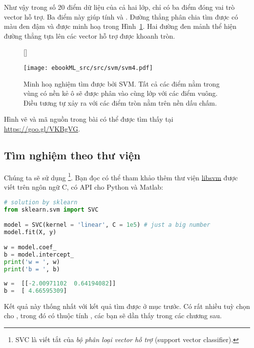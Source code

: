 Như vậy trong số 20 điểm dữ liệu của cả hai lớp, chỉ có ba điểm đóng vai trò  vector hỗ trợ. Ba điểm này giúp tính  và
.
Đường thẳng phân chia tìm được có màu đen đậm và được minh hoạ trong Hình~\ref{fig:svmf5}. Hai đường đen mảnh thể hiện
đường thẳng {tựa} lên các vector hỗ trợ được khoanh tròn.


\begin{figure}[t]
[\FBwidth]
{\caption{
Minh hoạ nghiệm tìm được bởi SVM. Tất cả các điểm nằm trong vùng có nền kẻ ô sẽ được phân vào cùng lớp với các điểm vuông. Điều tương tự xảy
ra với các điểm tròn nằm trên nền dấu chấm.
}
\label{fig:svmf5}}
{ %
\texttt{[image: ebookML\_src/src/svm/svm4.pdf]}
}
\end{figure}


Hình vẽ và mã nguồn trong bài có thể được tìm thấy tại \url{https://goo.gl/VKBgVG}.



\subsection{Tìm nghiệm theo thư viện}
Chúng ta sẽ sử dụng \href{http://scikit-learn.org/stable/modules/generated/sklearn.svm.SVC.html}{}\footnote{SVC là viết tắt của \textit{bộ phân loại vector hỗ trợ} (support vector classifier).}. Bạn đọc có thể tham khảo thêm thư viện \href{https://www.csie.ntu.edu.tw/~cjlin/libsvm/}{libsvm} được viết trên ngôn ngữ C, có API cho Python và Matlab:

\begin{lstlisting}[language=Python]
# solution by sklearn
from sklearn.svm import SVC

model = SVC(kernel = 'linear', C = 1e5) # just a big number
model.fit(X, y)

w = model.coef_
b = model.intercept_
print('w = ', w)
print('b = ', b)
\end{lstlisting}
\kq
\begin{lstlisting}[language=Python]
w =  [[-2.00971102  0.64194082]]
b =  [ 4.66595309]
\end{lstlisting}

Kết quả này thống nhất với kết quả tìm được ở mục trước. Có rất nhiều tuỳ chọn cho , trong đó có thuộc tính
, các bạn sẽ dần thấy trong các chương sau.



